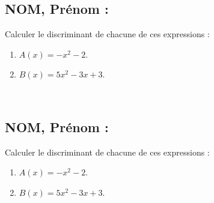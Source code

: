 \documentclass[a4paper,11pt,exos]{nsi} %
\begin{document}


\subsection*{NOM, Prénom : \dotfill} 

\maketitle

\begin{exercice}
    Calculer le discriminant de chacune de ces expressions :
    \begin{multicols}{2}
        \begin{enumerate}
            \item $A(x) = -x^2-2$.
	        \item $B(x) = 5x^2-3x+3$.
        \end{enumerate}
    \end{multicols}
    
\end{exercice}

\\



\subsection*{NOM, Prénom : \dotfill} 


\maketitle


\begin{exercice}
    Calculer le discriminant de chacune de ces expressions :
    \begin{multicols}{2}
        \begin{enumerate}
            \item $A(x) = -x^2-2$.
	        \item $B(x) = 5x^2-3x+3$.
        \end{enumerate}
    \end{multicols}
    
\end{exercice}
\end{document}
